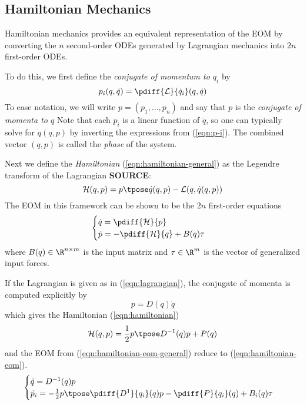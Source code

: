 \subsection{Hamiltonian Mechanics}
Hamiltonian mechanics provides an equivalent representation of the EOM
by converting the \(n\) second-order ODEs generated by Lagrangian mechanics into
\(2n\) first-order ODEs.

To do this, we first define the \textit{conjugate of momentum to \(q_i\)} by
\begin{equation}\label{eqn:p-i}
    p_i(q,\dot{q}) = \pdiff{\mathcal{L}}{\dot{q}_i}(q,\dot{q})
\end{equation}
To ease notation, we will write \(p = (p_1, \ldots, p_n)\) and say that \(p\) is
the \textit{conjugate of momenta to \(q\)} Note that each \(p_i\) is a linear
function of \(\dot{q}\), so one can typically solve for \(\dot{q}(q,p)\) by
inverting the expressions from (\ref{eqn:p-i}). The combined vector \((q,p)\) is
called the \textit{phase} of the system.

Next we define the \textit{Hamiltonian} (\ref{eqn:hamiltonian-general}) 
as the Legendre transform of the Lagrangian \textbf{SOURCE}:
\begin{equation}\label{eqn:hamiltonian-general}
    \mathcal{H}(q,p) = p\tpose \dot{q}(q,p) - \mathcal{L}(q,\dot{q}(q,p))
\end{equation}
The EOM in this framework can be shown to be the \(2n\)
first-order equations
\begin{equation}\label{eqn:hamiltonian-eom-general}
    \begin{cases}
        \dot{q} = \pdiff{\mathcal{H}}{p} \\
        \dot{p} = -\pdiff{\mathcal{H}}{q} + B(q)\tau \\
    \end{cases}
\end{equation}
where \(B(q) \in \R^{n\times m}\) is the input matrix and 
\(\tau \in \R^m\) is the vector of generalized input forces.

If the Lagrangian is given as in (\ref{eqn:lagrangian}), the conjugate of
momenta is computed explicitly by
\[
    p = D(q)\dot{q}
\]
which gives the Hamiltonian (\ref{eqn:hamiltonian})
\begin{equation}\label{eqn:hamiltonian}
    \mathcal{H}(q,p) = \frac{1}{2} p\tpose D^{-1}(q) p + P(q)
\end{equation}
and the EOM from (\ref{eqn:hamiltonian-eom-general}) reduce to 
(\ref{eqn:hamiltonian-eom}).
\begin{equation}\label{eqn:hamiltonian-eom}
    \begin{cases}
        \dot{q} = D^{-1}(q)p \\
        \dot{p_i} = -\frac{1}{2} p\tpose \pdiff{D^{1}}{q_i}(q) p -
        \pdiff{P}{q_i}(q) + B_i(q) \tau \\
    \end{cases}
\end{equation}

